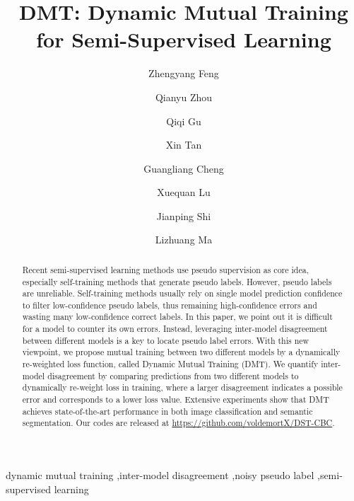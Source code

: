 \documentclass[preprint,review,10pt]{elsarticle}
\begin{document}
\begin{frontmatter}



\title{DMT: Dynamic Mutual Training for Semi-Supervised Learning}

\author[1]{Zhengyang Feng}
\author[1]{Qianyu Zhou}
\author[1]{Qiqi Gu}
\author[1]{Xin Tan}
\author[2]{Guangliang Cheng}
\author[3]{Xuequan Lu}
\author[2]{Jianping Shi}
\author[1]{Lizhuang Ma}
\address[1]{Shanghai Jiao Tong University, Shanghai, China}
\address[2]{SenseTime Research, Shanghai, China}
\address[3]{Deakin University, Australia}
            




\begin{abstract}
Recent semi-supervised learning methods use pseudo supervision as core idea, especially self-training methods that generate pseudo labels. However, pseudo labels are unreliable. Self-training methods usually rely on single model prediction confidence to filter low-confidence pseudo labels, thus remaining high-confidence errors and wasting many low-confidence correct labels. In this paper, we point out it is difficult for a model to counter its own errors. Instead, leveraging inter-model disagreement between different models is a key to locate pseudo label errors. With this new viewpoint, we propose mutual training between two different models by a dynamically re-weighted loss function, called Dynamic Mutual Training (DMT). We quantify inter-model disagreement by comparing predictions from two different models to dynamically re-weight loss in training, where a larger disagreement indicates a possible error and corresponds to a lower loss value. Extensive experiments show that DMT achieves state-of-the-art performance in both image classification and semantic segmentation. Our codes are released at \url{https://github.com/voldemortX/DST-CBC}.

\end{abstract}







\begin{keyword}
dynamic mutual training \sep inter-model disagreement \sep noisy pseudo label \sep semi-supervised learning
\end{keyword}

\end{frontmatter}
\end{document}
